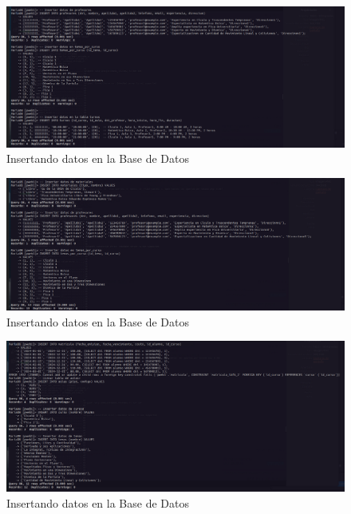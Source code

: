 \begin{figure}[H]
  \centering
  \includegraphics[width=1.0\textwidth]{img/Insertando_Datos_3.png}
  \caption{Insertando datos en la Base de Datos}
\end{figure}
\begin{figure}[H]
  \centering
  \includegraphics[width=1.0\textwidth]{img/Insertando_Datos_4.png}
  \caption{Insertando datos en la Base de Datos}
\end{figure}
\begin{figure}[H]
  \centering
  \includegraphics[width=1.0\textwidth]{img/Insertando_Datos_5.png}
  \caption{Insertando datos en la Base de Datos}
\end{figure}

